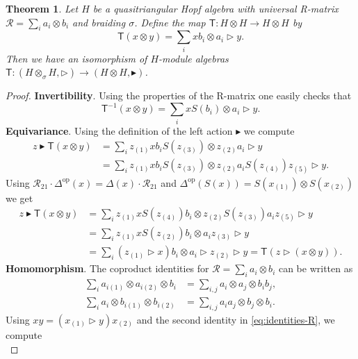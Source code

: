 \documentclass[a4paper, 12pt, reqno, english]{amsart}
\numberwithin{equation}{section}
\numberwithin{figure}{section}
\theoremstyle{plain}
\newtheorem{theorem}{Theorem}[section]
\theoremstyle{plain}
\theoremstyle{plain}
\theoremstyle{plain}
\theoremstyle{plain}
\theoremstyle{definition}
\theoremstyle{definition}
\theoremstyle{definition}
\theoremstyle{remark}
\theoremstyle{definition}
\theoremstyle{definition}
\newcommand{\op}{\mathrm{op}}
\newcommand{\calR}{\mathcal{R}}
\newcommand{\tmap}{\mathsf{T}}
\begin{document}
\begin{theorem}
\label{thm:transmutation}
Let $H$ be a quasitriangular Hopf algebra with universal R-matrix $\calR = \sum_i a_i \otimes b_i$ and braiding $\sigma$.
Define the map $\tmap: H \otimes H \to H \otimes H$ by
\[
\tmap(x \otimes y) = \sum_i x b_i \otimes a_i \triangleright y.
\]
Then we have an isomorphism of $H$-module algebras $\tmap: (H \otimes_\sigma H, \triangleright) \to (H \otimes H, \blacktriangleright)$.
\end{theorem}

\begin{proof}
\textbf{Invertibility}. Using the properties of the R-matrix one easily checks that
\[
\tmap^{-1}(x \otimes y) = \sum_i x S(b_i) \otimes a_i \triangleright y.
\]
\textbf{Equivariance}. Using the definition of the left action $\blacktriangleright$ we compute
\[
\begin{split}
z \blacktriangleright \tmap(x \otimes y)
& = \sum_i z_{(1)} x b_i S(z_{(3)}) \otimes z_{(2)} a_i \triangleright y \\
& = \sum_i z_{(1)} x b_i S(z_{(3)}) \otimes z_{(2)} a_i S(z_{(4)}) z_{(5)} \triangleright y.
\end{split}
\]
Using $\calR_{2 1} \cdot \Delta^\op(x) = \Delta(x) \cdot \calR_{2 1}$ and $\Delta^\op(S(x)) = S(x_{(1)}) \otimes S(x_{(2)})$ we get
\[
\begin{split}
z \blacktriangleright \tmap(x \otimes y)
& = \sum_i z_{(1)} x S(z_{(4)}) b_i \otimes z_{(2)} S(z_{(3)}) a_i z_{(5)} \triangleright y \\
& = \sum_i z_{(1)} x S(z_{(2)}) b_i \otimes a_i z_{(3)} \triangleright y \\
& = \sum_i (z_{(1)} \triangleright x) b_i \otimes a_i \triangleright z_{(2)} \triangleright y = \tmap(z \triangleright (x \otimes y)).
\end{split}
\]
\textbf{Homomorphism}. The coproduct identities for $\calR = \sum_i a_i \otimes b_i$ can be written as
\begin{equation}
\label{eq:identities-R}
\begin{split}
\sum_i a_{i (1)} \otimes a_{i (2)} \otimes b_i & = \sum_{i, j} a_i \otimes a_j \otimes b_i b_j, \\
\sum_i a_i \otimes b_{i (1)} \otimes b_{i (2)} & = \sum_{i, j} a_i a_j \otimes b_j \otimes b_i.
\end{split}
\end{equation}
Using $x y = (x_{(1)} \triangleright y) x_{(2)}$ and the second identity in \eqref{eq:identities-R}, we compute
\[
\]
\end{proof}
\end{document}
